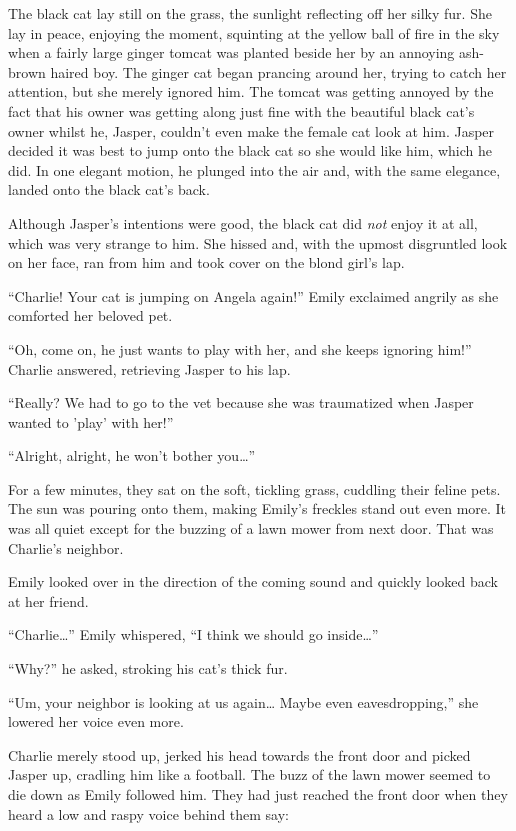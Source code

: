 The black cat lay still on the grass, the sunlight reflecting off her silky fur. She lay in peace, enjoying the moment, squinting at the yellow ball of fire in the sky when a fairly large ginger tomcat was planted beside her by an annoying ash-brown haired boy. The ginger cat began prancing around her, trying to catch her attention, but she merely ignored him. The tomcat was getting annoyed by the fact that his owner was getting along just fine with the beautiful black cat's owner whilst he, Jasper, couldn't even make the female cat look at him. Jasper decided it was best to jump onto the black cat so she would like him, which he did. In one elegant motion, he plunged into the air and, with the same elegance, landed onto the black cat's back.

Although Jasper's intentions were good, the black cat did \textit{not} enjoy it at all, which was very strange to him. She hissed and, with the upmost disgruntled look on her face, ran from him and took cover on the blond girl's lap.

“Charlie! Your cat is jumping on Angela again!” Emily exclaimed angrily as she comforted her beloved pet.

“Oh, come on, he just wants to play with her, and she keeps ignoring him!” Charlie answered, retrieving Jasper to his lap.

“Really? We had to go to the vet because she was traumatized when Jasper wanted to 'play' with her!”

“Alright, alright, he won't bother you…”

For a few minutes, they sat on the soft, tickling grass, cuddling their feline pets. The sun was pouring onto them, making Emily's freckles stand out even more. It was all quiet except for the buzzing of a lawn mower from next door. That was Charlie's neighbor.

Emily looked over in the direction of the coming sound and quickly looked back at her friend.

“Charlie…” Emily whispered, “I think we should go inside…”

“Why?” he asked, stroking his cat's thick fur.

“Um, your neighbor is looking at us again… Maybe even eavesdropping,” she lowered her voice even more.

Charlie merely stood up, jerked his head towards the front door and picked Jasper up, cradling him like a football. The buzz of the lawn mower seemed to die down as Emily followed him. They had just reached the front door when they heard a low and raspy voice behind them say:

